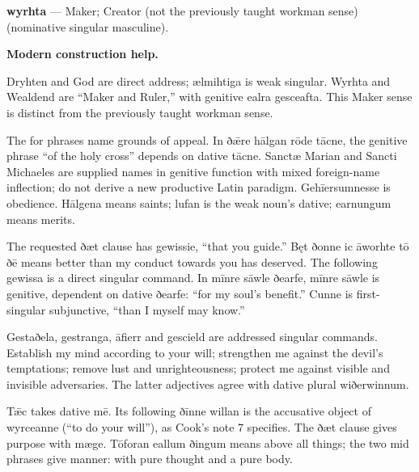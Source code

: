\textbf{wyrhta} — Maker; Creator (not the previously taught workman sense) (nominative singular masculine).

\textbf{Modern construction help.}

Dryhten and God are direct address; ælmihtiga is weak singular. Wyrhta and Wealdend are “Maker and Ruler,” with genitive ealra gesceafta. This Maker sense is distinct from the previously taught workman sense.

The for phrases name grounds of appeal. In ðǣre hālgan rōde tācne, the genitive phrase “of the holy cross” depends on dative tācne. Sanctæ Marian and Sancti Michaeles are supplied names in genitive function with mixed foreign-name inflection; do not derive a new productive Latin paradigm. Gehīersumnesse is obedience. Hālgena means saints; lufan is the weak noun’s dative; earnungum means merits.

The requested ðæt clause has gewissie, “that you guide.” Bęt ðonne ic āworhte tō ðē means better than my conduct towards you has deserved. The following gewissa is a direct singular command. In mīnre sāwle ðearfe, mīnre sāwle is genitive, dependent on dative ðearfe: “for my soul’s benefit.” Cunne is first-singular subjunctive, “than I myself may know.”

Gestaðela, gestranga, āfierr and gescield are addressed singular commands. Establish my mind according to your will; strengthen me against the devil’s temptations; remove lust and unrighteousness; protect me against visible and invisible adversaries. The latter adjectives agree with dative plural wiðerwinnum.

Tǣc takes dative mē. Its following ðīnne willan is the accusative object of wyrceanne (“to do your will”), as Cook’s note 7 specifies. The ðæt clause gives purpose with mæge. Tōforan eallum ðingum means above all things; the two mid phrases give manner: with pure thought and a pure body.

